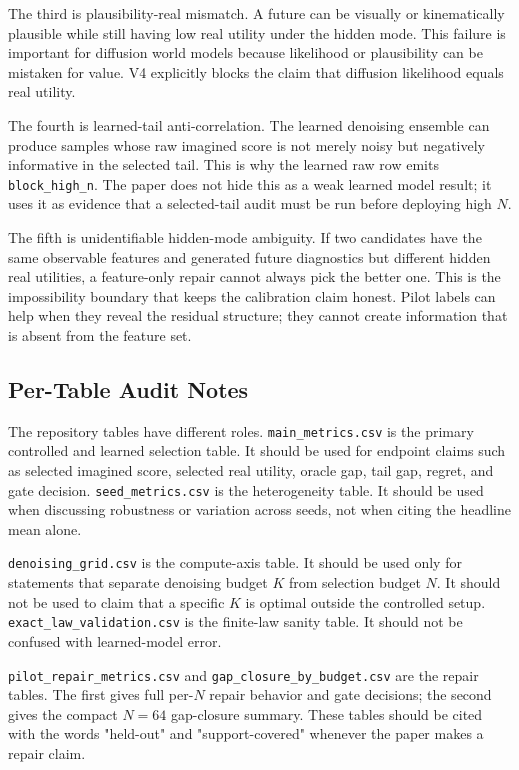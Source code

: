 \documentclass{article}
\begin{document}
The third is plausibility-real mismatch. A future can be visually or
kinematically plausible while still having low real utility under the hidden
mode. This failure is important for diffusion world models because likelihood
or plausibility can be mistaken for value. V4 explicitly blocks the claim that
diffusion likelihood equals real utility.

The fourth is learned-tail anti-correlation. The learned denoising ensemble
can produce samples whose raw imagined score is not merely noisy but
negatively informative in the selected tail. This is why the learned raw row
emits \texttt{block\_high\_n}. The paper does not hide this as a weak learned
model result; it uses it as evidence that a selected-tail audit must be run
before deploying high $N$.

The fifth is unidentifiable hidden-mode ambiguity. If two candidates have the
same observable features and generated future diagnostics but different hidden
real utilities, a feature-only repair cannot always pick the better one. This
is the impossibility boundary that keeps the calibration claim honest. Pilot
labels can help when they reveal the residual structure; they cannot create
information that is absent from the feature set.

\subsection{Per-Table Audit Notes}
\label{app:v4-table-notes}

The repository tables have different roles. \texttt{main\_metrics.csv} is the
primary controlled and learned selection table. It should be used for endpoint
claims such as selected imagined score, selected real utility, oracle gap,
tail gap, regret, and gate decision. \texttt{seed\_metrics.csv} is the
heterogeneity table. It should be used when discussing robustness or variation
across seeds, not when citing the headline mean alone.

\texttt{denoising\_grid.csv} is the compute-axis table. It should be used only
for statements that separate denoising budget $K$ from selection budget $N$.
It should not be used to claim that a specific $K$ is optimal outside the
controlled setup. \texttt{exact\_law\_validation.csv} is the finite-law sanity
table. It should not be confused with learned-model error.

\texttt{pilot\_repair\_metrics.csv} and
\texttt{gap\_closure\_by\_budget.csv} are the repair tables. The first gives
full per-$N$ repair behavior and gate decisions; the second gives the compact
$N=64$ gap-closure summary. These tables should be cited with the words
"held-out" and "support-covered" whenever the paper makes a repair claim.
\end{document}
